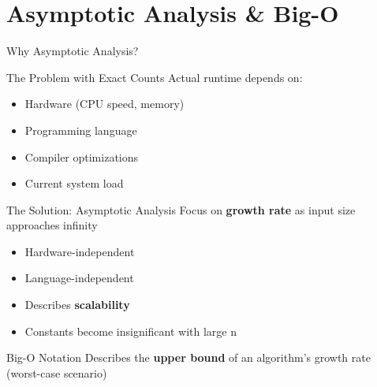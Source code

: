 \documentclass[aspectratio=169,xcolor=dvipsnames]{beamer}
\begin{document}
\section{Asymptotic Analysis \& Big-O}

\begin{frame}{Why Asymptotic Analysis?}
  \begin{block}{The Problem with Exact Counts}
    Actual runtime depends on:
    \begin{itemize}
      \item Hardware (CPU speed, memory)
      \item Programming language
      \item Compiler optimizations
      \item Current system load
    \end{itemize}
  \end{block}

  \vspace{0.3cm}

  \begin{block}{The Solution: Asymptotic Analysis}
    Focus on \textbf{growth rate} as input size approaches infinity
    \begin{itemize}
      \item Hardware-independent
      \item Language-independent
      \item Describes \textbf{scalability}
      \item Constants become insignificant with large n
    \end{itemize}
  \end{block}

  \vspace{0.3cm}

  \begin{alertblock}{Big-O Notation}
    Describes the \textbf{upper bound} of an algorithm's growth rate (worst-case scenario)
  \end{alertblock}
\end{frame}
\end{document}
